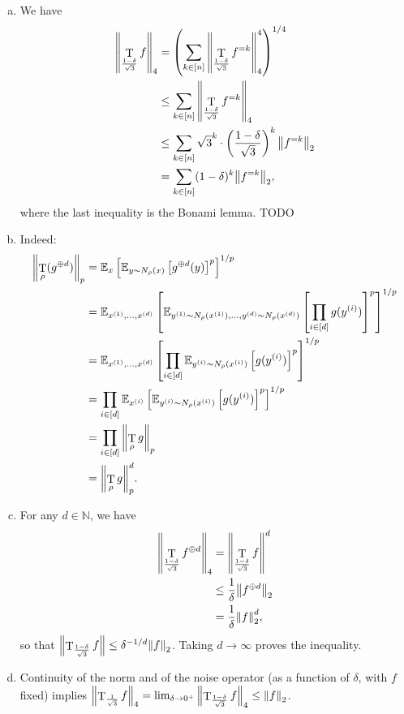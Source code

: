 \documentclass[12pt]{article}
\newcommand{\E}[2][]{\mathbb E_{#1}\left[#2\right]}
\newcommand{\N}{\mathbb N}
\newcommand{\sumk}{\sum_{k \in [n]}}
\DeclareMathOperator{\T}{T}
\newcommand{\TODO}{{\color{red}TODO}}
\begin{document}
\subsection{}
\begin{enumerate}[(a)]
    \item We have
    \begin{align*}
        \norm{\T_{\frac{1-\delta}{\sqrt{3}}} f}_4 &= \left(\sumk \norm{\T_{\frac{1-\delta}{\sqrt{3}}} f^{=k}}^4_4\right)^{1/4}\\
        &\leq \sumk \norm{\T_{\frac{1-\delta}{\sqrt{3}}} f^{=k}}_4\\
        &\leq \sumk \sqrt{3}^k \cdot \left(\frac{1-\delta}{\sqrt{3}}\right)^k \norm{f^{=k}}_2\\
        &= \sumk (1 - \delta)^k \norm{f^{=k}}_2,
    \end{align*}
    where the last inequality is the Bonami lemma. \TODO
    
    \item Indeed:
    \begin{align*}
        \norm{\T_\rho(g^{\oplus d})}_p &= \E[x]{\E[y \sim N_\rho(x)]{g^{\oplus d}(y)}^p}^{1/p}\\
        &= \E[x^{(1)}, \ldots, x^{(d)}]{\E[y^{(1)} \sim N_\rho(x^{(1)}), \ldots, y^{(d)} \sim N_\rho(x^{(d)})]{\prod_{i \in [d]} g(y^{(i)})}^p}^{1/p}\\
        &= \E[x^{(1)}, \ldots, x^{(d)}]{ \prod_{i \in [d]} \E[y^{(i)} \sim N_\rho(x^{(i)})]{g(y^{(i)})}^p}^{1/p}\\
        &= \prod_{i \in [d]}\E[x^{(i)}]{\E[y^{(i)} \sim N_\rho(x^{(i)})]{g(y^{(i)})}^p}^{1/p}\\
        &= \prod_{i \in [d]} \norm{\T_\rho g}_p\\
        &= \norm{\T_\rho g}_p^d.
    \end{align*}
    
    \item For any $d \in \N$, we have
    \begin{align*}
        \norm{\T_{\frac{1-\delta}{\sqrt{3}}} f^{\oplus d}}_4 &= \norm{\T_{\frac{1-\delta}{\sqrt{3}}} f}^d\\
        &\leq \frac1{\delta} \norm{f^{\oplus d}}_2\\
        &= \frac1{\delta} \norm{f}_2^d,
    \end{align*}
    so that $\norm{\T_{\frac{1-\delta}{\sqrt{3}}} f} \leq \delta^{-1/d} \norm{f}_2$. Taking $d \to \infty$ proves the inequality.
    
    \item Continuity of the norm and of the noise operator (as a function of $\delta$, with $f$ fixed) implies $\norm{\T_{\frac1{\sqrt{3}}} f}_4 = \lim_{\delta \to 0^+} \norm{\T_{\frac{1-\delta}{\sqrt{3}}} f}_4 \leq \norm{f}_2$.
\end{enumerate}
\end{document}
